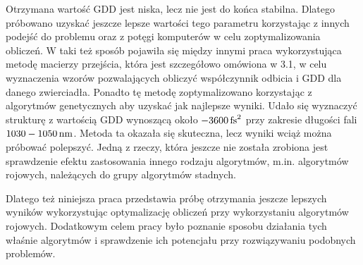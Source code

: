 Otrzymana wartość GDD jest niska, lecz nie jest do końca stabilna. Dlatego próbowano uzyskać jeszcze lepsze wartości tego parametru korzystając z innych podejść do problemu oraz z potęgi komputerów w celu zoptymalizowania obliczeń. W taki też sposób pojawiła się między innymi praca \cite{dbr2} wykorzystująca metodę macierzy przejścia, która jest szczegółowo omówiona w 3.1, w celu wyznaczenia wzorów pozwalających obliczyć współczynnik odbicia i GDD dla danego zwierciadła. Ponadto tę metodę zoptymalizowano korzystając z algorytmów genetycznych aby uzyskać jak najlepsze wyniki. Udało się wyznaczyć strukturę z wartością GDD wynoszącą około $-3600\,\mathrm{fs}^2$ przy zakresie długości fali $1030 - 1050\,\mathrm{nm}$. Metoda ta okazała się skuteczna, lecz wyniki wciąż można próbować polepszyć. Jedną z rzeczy, która jeszcze nie została zrobiona jest sprawdzenie efektu zastosowania innego rodzaju algorytmów, m.in. algorytmów rojowych, należących do grupy algorytmów stadnych.

Dlatego też niniejsza praca przedstawia próbę otrzymania jeszcze lepszych wyników wykorzystując optymalizację obliczeń przy wykorzystaniu algorytmów rojowych. Dodatkowym celem pracy było poznanie sposobu działania tych właśnie algorytmów i sprawdzenie ich potencjału przy rozwiązywaniu podobnych problemów.